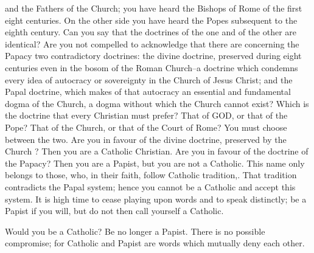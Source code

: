 and the Fathers of the Church; you have heard the Bishops of Rome of the first eight centuries. On the other side you have heard the Popes subsequent to the eighth century. Can you say that the doctrines of the one and of the other are identical? Are you not compelled to acknowledge that there are concerning the Papacy two contradictory doctrines: the divine doctrine, preserved during eight centuries even in the bosom of the Roman Church--a doctrine which condemns every idea of autocracy or sovereignty in the Church of Jesus Christ; and the Papal doctrine, which makes of that autocracy an essential and fundamental dogma of the Church, a dogma without which the Church cannot exist? Which is the doctrine that every Christian must prefer? That of GOD, or that of the Pope? That of the Church, or that of the Court of Rome? You must choose between the two. Are you in favour of the divine doctrine, preserved by the Church ? Then you are a Catholic Christian. Are you in favour of the doctrine of the Papacy? Then you are a Papist, but you are not a Catholic. This name only belongs to those, who, in their faith, follow Catholic tradition,. That tradition contradicts the Papal system; hence you cannot be a Catholic and accept this system. It is high time to cease playing upon words and to speak distinctly; be a Papist if you will, but do not then call yourself a Catholic.

Would you be a Catholic? Be no longer a Papist. There is no possible compromise; for Catholic and Papist are words which mutually deny each other.


